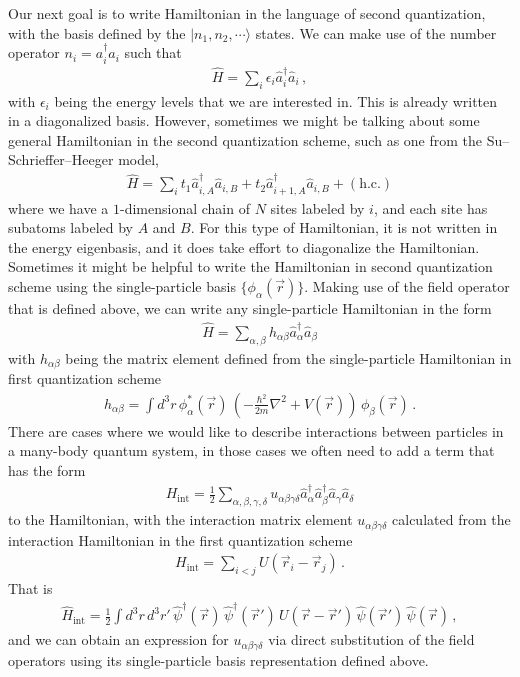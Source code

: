\documentclass[11pt, onesided]{book}
\theoremstyle{break}
\theoremstyle{break}
\begin{document}
Our next goal is to write  Hamiltonian in the language of second quantization, with the basis defined by the $|n_1, n_2,\cdots\rangle$ states. We can make use of the number operator $n_i = a_i^\dagger a_i$ such that
\begin{align*}
\hat{H} = \sum_i \epsilon_i \hat{a}_i^\dagger \hat{a}_i\,,
\end{align*}
with $\epsilon_i$ being the energy levels that we are interested in. This is already written in a diagonalized basis. However, sometimes we might be talking about some general Hamiltonian in the second quantization scheme, such as one from the Su–Schrieffer–Heeger model,
\begin{align*}
\hat{H} = \sum_i t_1 \hat{a}_{i,A}^\dagger \hat{a}_{i,B} + t_2 \hat{a}_{i+1,A}^\dagger \hat{a}_{i,B} + (\text{h.c.})
\end{align*}
where we have a $1$-dimensional chain of $N$ sites labeled by $i$, and each site has subatoms labeled by $A$ and $B$. For this type of Hamiltonian, it is not written in the energy eigenbasis, and it does take effort to diagonalize the Hamiltonian.\\

Sometimes it might be helpful to write the Hamiltonian in second quantization scheme using the single-particle basis $\{\phi_\alpha(\vec{r})\}$. Making use of the field operator that is defined above, we can write any single-particle Hamiltonian in the form 
\begin{align*}
\hat{H} = \sum_{\alpha, \beta}h_{\alpha\beta} \hat{a}_\alpha^\dagger \hat{a}_\beta 
\end{align*}
with $h_{\alpha\beta}$ being the matrix element defined from the single-particle Hamiltonian in first quantization scheme 
\begin{align*}
h_{\alpha\beta} = \int d^3r\, \phi_\alpha^*(\vec{r}) \,\left( 
-\frac{\hbar^2}{2m}\nabla^2 + V(\vec{r})\right) \, \phi_\beta(\vec{r})
\,.
\end{align*}
There are cases where we would like to describe interactions between particles in a many-body quantum system, in those cases we often need to add a term that has the form 
\begin{align*}
H_{\text{int}}=\frac{1}{2}\sum_{\alpha,\beta, \gamma, \delta} u_{\alpha\beta\gamma\delta} \hat{a}_\alpha^\dagger \hat{a}_\beta^\dagger \hat{a}_\gamma \hat{a}_\delta
\end{align*}
to the Hamiltonian, with the interaction matrix element $u_{\alpha\beta\gamma\delta}$ calculated from the interaction Hamiltonian in the first quantization scheme
\begin{align*}
H_{\text{int}} = \sum_{i<j}U(\vec{r}_i- \vec{r}_j)\,.
\end{align*}
That is 
\begin{align*}
\hat{H}_{\text{int}} = \frac{1}{2}\int d^3r\, d^3r' \, \hat{\psi}^\dagger(\vec{r})\, \hat{\psi}^\dagger(\vec{r}')\, U(\vec{r} - \vec{r}')\, \hat{\psi}(\vec{r}') \, \hat{\psi}(\vec{r})\,,
\end{align*}
and we can obtain an expression for $u_{\alpha\beta\gamma\delta}$ via direct substitution of the field operators using its single-particle basis representation defined above. 
\end{document}
